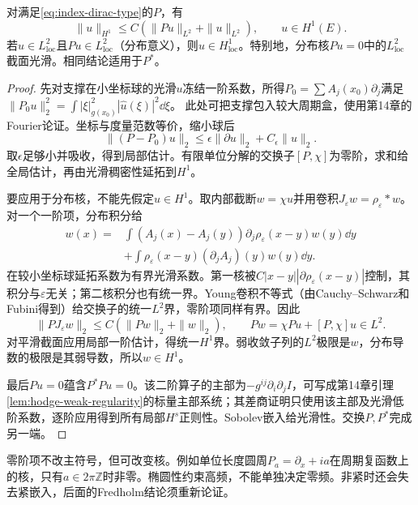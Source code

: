 \begin{lemma}[一阶估计及分布核的光滑性]\label{lem:index-first-order}
对满足\eqref{eq:index-dirac-type}的$P$，有
\[
 \|u\|_{H^1}\leq C(\|Pu\|_{L^2}+\|u\|_{L^2}),\qquad u\in H^1(E).
\]
若$u\in L^2_{\mathrm{loc}}$且$Pu\in L^2_{\mathrm{loc}}$（分布意义），则$u\in H^1_{\mathrm{loc}}$。特别地，分布核$Pu=0$中的$L^2_{\mathrm{loc}}$截面光滑。相同结论适用于$P^*$。
\end{lemma}
\begin{proof}
先对支撑在小坐标球的光滑$u$冻结一阶系数，所得$P_0=\sum A_j(x_0)\partial_j$满足
$\|P_0u\|_2^2=\int|\xi|_{g(x_0)}^2|\widehat u(\xi)|^2\dd\xi$。
此处可把支撑包入较大周期盒，使用第14章的Fourier论证。坐标与度量范数等价，缩小球后
\[
 \|(P-P_0)u\|_2\leq\epsilon\|\partial u\|_2+C_\epsilon\|u\|_2.
\]
取$\epsilon$足够小并吸收，得到局部估计。有限单位分解的交换子$[P,\chi]$为零阶，求和给全局估计，再由光滑稠密性延拓到$H^1$。

要应用于分布核，不能先假定$u\in H^1$。取内部截断$w=\chi u$并用卷积$J_\varepsilon w=\rho_\varepsilon*w$。对一个一阶项，分布积分给
\begin{align*}
 [A_j\partial_j,J_\varepsilon]w(x)
 ={}&\int(A_j(x)-A_j(y))\partial_j\rho_\varepsilon(x-y)w(y)\dd y\\
 &+\int\rho_\varepsilon(x-y)(\partial_jA_j)(y)w(y)\dd y.
\end{align*}
在较小坐标球延拓系数为有界光滑系数。第一核被$C|x-y||\partial\rho_\varepsilon(x-y)|$控制，其积分与$\varepsilon$无关；第二核积分也有统一界。Young卷积不等式（由Cauchy--Schwarz和Fubini得到）给交换子的统一$L^2$界，零阶项同样有界。因此
\[
 \|P J_\varepsilon w\|_2\leq C(\|Pw\|_2+\|w\|_2),\qquad
 Pw=\chi Pu+[P,\chi]u\in L^2.
\]
对平滑截面应用局部一阶估计，得统一$H^1$界。弱收敛子列的$L^2$极限是$w$，分布导数的极限是其弱导数，所以$w\in H^1$。

最后$Pu=0$蕴含$P^*Pu=0$。该二阶算子的主部为$-g^{ij}\partial_i\partial_j I$，可写成第14章引理\ref{lem:hodge-weak-regularity}的标量主部系统；其差商证明只使用该主部及光滑低阶系数，逐阶应用得到所有局部$H^s$正则性。Sobolev嵌入给光滑性。交换$P,P^*$完成另一端。
\end{proof}

零阶项不改主符号，但可改变核。例如单位长度圆周$P_a=\partial_x+ia$在周期复函数上的核，只有$a\in2\pi\mathbb Z$时非零。椭圆性约束高频，不能单独决定零频。非紧时还会失去紧嵌入，后面的Fredholm结论须重新论证。
